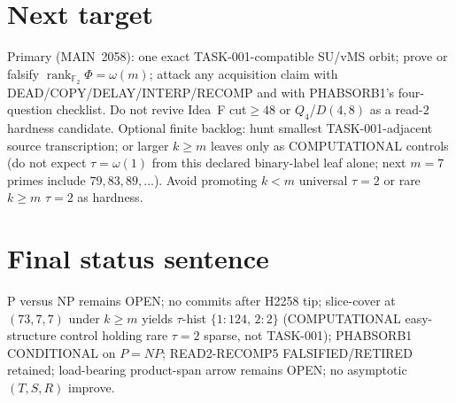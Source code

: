 \documentclass[11pt]{article}
\begin{document}
\section*{Next target}
Primary (MAIN~2058): one exact TASK-001-compatible SU/vMS orbit; prove or falsify
$\operatorname{rank}_{\mathbb F_2}\Phi=\omega(m)$; attack any acquisition claim with
DEAD/COPY/DELAY/INTERP/RECOMP and with PHABSORB1's four-question checklist.
Do not revive Idea~F cut$\ge48$ or $Q_4$/$D(4,8)$ as a read-$2$ hardness candidate.
Optional finite backlog: hunt smallest TASK-001-adjacent source transcription;
or larger $k{\ge}m$ leaves only as COMPUTATIONAL controls (do not expect $\tau=\omega(1)$
from this declared binary-label leaf alone; next $m{=}7$ primes include $79,83,89,\ldots$).
Avoid promoting $k{<}m$ universal $\tau{=}2$ or rare $k{\ge}m$ $\tau{=}2$ as hardness.

\section*{Final status sentence}
P versus NP remains OPEN; no commits after H2258 tip; slice-cover at $(73,7,7)$
under $k{\ge}m$ yields $\tau$-hist $\{1{:}124,\,2{:}2\}$ (COMPUTATIONAL easy-structure
control holding rare $\tau{=}2$ sparse, not TASK-001); PHABSORB1 CONDITIONAL on $P=NP$;
READ2-RECOMP5 FALSIFIED/RETIRED retained; load-bearing product-span arrow remains OPEN;
no asymptotic $(T,S,R)$ improve.
\end{document}

